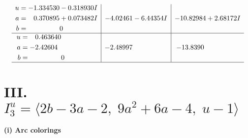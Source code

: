 \documentclass[1p]{elsarticle_modified}
\theoremstyle{definition}
\begin{document}
$$\begin{array}{c|c|c}
\begin{aligned}
u &= -1.334530 - 0.318930 I \\
a &= \phantom{-}0.370895 + 0.073482 I \\
b &= \phantom{-0.000000 } 0\end{aligned}
 & -4.02461 - 6.44354 I & -10.82984 + 2.68172 I \\ \hline\begin{aligned}
u &= \phantom{-}0.463640\phantom{ +0.000000I} \\
a &= -2.42604\phantom{ +0.000000I} \\
b &= \phantom{-0.000000 } 0\end{aligned}
 & -2.48997\phantom{ +0.000000I} & -13.8390\phantom{ +0.000000I}\\
 \hline 
 \end{array}$$\newpage\newpage\renewcommand{\arraystretch}{1}
\centering \section*{III. $I^u_{3}= \langle 2 b-3 a-2,\;9 a^2+6 a-4,\;u-1 \rangle$}
\flushleft \textbf{(i) Arc colorings}\\
\end{document}
